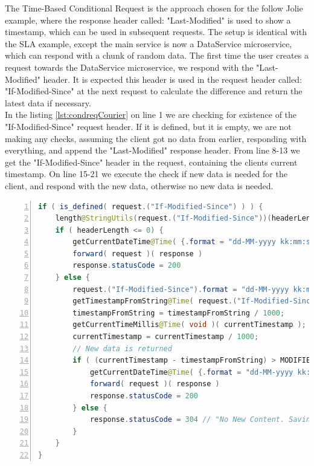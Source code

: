 \documentclass[12pt]{article}
\begin{document}
The Time-Based Conditional Request \cite{CondReqMAPI:1} is the approach chosen for the follow Jolie example, where the response header called: "Last-Modified" is used to show a timestamp, which can be used in subsequent requests. The setup is identical with the SLA example, except the main service is now a DataService microservice, which can respond with a chunk of random data. The first time the user creates a request towards the DataService microservice, we respond with the "Last-Modified" header. It is expected this header is used in the request header called: "If-Modified-Since" \cite{CondReqRFC:1} at the next request to calculate the difference and return the latest data if necessary. \\
In the listing \ref{lst:condreqCourier} on line 1 we are checking for existence of the "If-Modified-Since" request header. If it is defined, but it is empty, we are not making any checks, assuming the client got no data from earlier, responding with everything, and append the "Last-Modified" response header. From line 8-13 we get the "If-Modified-Since" header in the request, containing the clients current timestamp. On line 15-21 we execute the check if new data is needed for the client, and respond with the new data, otherwise no new data is needed. 

\begin{lstlisting}[caption=Courier operations for the Conditional Request service, 
    captionpos=b, language=java, label=condreqCourier, frame=single, breaklines=true, numbers=left]
if ( is_defined( request.("If-Modified-Since") ) ) {
    length@StringUtils(request.("If-Modified-Since"))(headerLength);
    if ( headerLength <= 0) {
        getCurrentDateTime@Time( {.format = "dd-MM-yyyy kk:mm:ss"} )( lastModified );
        forward( request )( response )
        response.statusCode = 200
    } else {
        request.("If-Modified-Since").format = "dd-MM-yyyy kk:mm:ss";
        getTimestampFromString@Time( request.("If-Modified-Since") )( timestampFromString );
        timestampFromString = timestampFromString / 1000;
        getCurrentTimeMillis@Time( void )( currentTimestamp );
        currentTimestamp = currentTimestamp / 1000;
        // New data is returned
        if ( (currentTimestamp - timestampFromString) > MODIFIED_TIMESTAMP ) {
            getCurrentDateTime@Time( {.format = "dd-MM-yyyy kk:mm:ss"} )( lastModified );
            forward( request )( response )
            response.statusCode = 200
        } else {
            response.statusCode = 304 // "No New Content. Saving Bandwidth";
        }
    }
}
\end{lstlisting}
\end{document}
